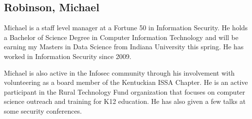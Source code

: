 \subsection{Robinson, Michael}

Michael is a staff level manager at a Fortune 50 in Information
Security. He holds a Bachelor of Science Degree in Computer
Information Technology and will be earning my Masters in Data Science
from Indiana University this spring. He has worked in Information
Security since 2009.

Michael is also active in the Infosec community through his
involvement with volunteering as a board member of the Kentuckian ISSA
Chapter. He is an active participant in the Rural Technology Fund
organization that focuses on computer science outreach and training
for K12 education. He has also given a few talks at some security
conferences.
